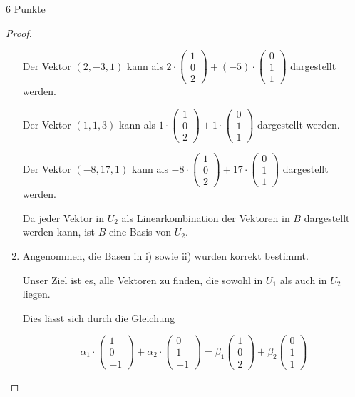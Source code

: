 \documentclass{../problemset}
\begin{document}
\begin{problem}{6 Punkte}
\begin{proof}
\begin{enumerate}
		      Der Vektor $(2, -3, 1)$ kann als $2 \cdot \begin{pmatrix} 1 \\ 0 \\ 2 \end{pmatrix} + (-5) \cdot \begin{pmatrix} 0 \\ 1 \\ 1 \end{pmatrix}$ dargestellt werden.

		      Der Vektor $(1, 1, 3)$ kann als $1 \cdot \begin{pmatrix} 1 \\ 0 \\ 2 \end{pmatrix} + 1 \cdot \begin{pmatrix} 0 \\ 1 \\ 1 \end{pmatrix}$ dargestellt werden.

		      Der Vektor $(-8, 17, 1)$ kann als $-8 \cdot \begin{pmatrix} 1 \\ 0 \\ 2 \end{pmatrix} + 17 \cdot \begin{pmatrix} 0 \\ 1 \\ 1 \end{pmatrix}$ dargestellt werden.

		      Da jeder Vektor in $U_2$ als Linearkombination der Vektoren in $B$ dargestellt werden kann, ist $B$ eine Basis von $U_2$.

		\item Angenommen, die Basen in i) sowie ii) wurden korrekt bestimmt.

		      Unser Ziel ist es, alle Vektoren zu finden, die sowohl in \(U_1\) als auch in \(U_2\) liegen.

		      Dies lässt sich durch die Gleichung

		      \[
			      \alpha_1 \cdot \begin{pmatrix}
				      1 \\
				      0 \\
				      -1
			      \end{pmatrix} + \alpha_2 \cdot \begin{pmatrix}
				      0 \\
				      1 \\
				      -1
			      \end{pmatrix} = \beta_1 \begin{pmatrix}
				      1 \\ 0 \\ 2
			      \end{pmatrix} + \beta_2 \begin{pmatrix}
				      0 \\ 1 \\ 1
			      \end{pmatrix}
		      \]


\end{enumerate}
\end{proof}
\end{problem}
\end{document}
